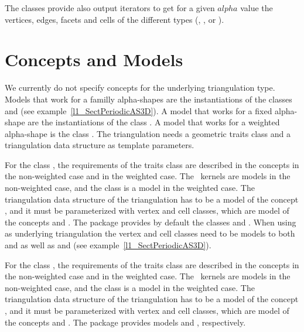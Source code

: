 The classes provide also output iterators  to  get for a given $alpha$ value
the vertices, edges, facets and cells of the different types
(, ,  or 
).



\section{Concepts and Models\label{I1_SectDtClass3D}}


We currently do not specify concepts for the underlying triangulation
type. Models that work for a familly alpha-shapes are the instantiations
of the classes  and
 (see
example~\ref{l1_SectPeriodicAS3D}). A model that works for a fixed alpha-shape are the instantiations
of the class .
A model that works for a weighted alpha-shape is 
the class . The triangulation needs a geometric traits class 
and a triangulation data structure as template parameters.

For the class , the requirements of
the traits class are described in the concepts 
in the non-weighted case and  in the weighted case.
The \cgal\ kernels are models in the non-weighted case, and 
the class  is a model
in the weighted case.
The triangulation data structure of the triangulation
has to be a model of the concept ,
and it must be parameterized with vertex and cell classes, which are model of the concepts
 and .
The package provides by default the classes
 and
. When using
 as underlying
triangulation the vertex and cell classes need to be models to both
 and
 as well as
 and 
(see example~\ref{l1_SectPeriodicAS3D}). 



For the class , the requirements of
the traits class are described in the concepts 
in the non-weighted case and  in the weighted case.
The \cgal\ kernels are models in the non-weighted case, and 
the class  is a model
in the weighted case.
The triangulation data structure of the triangulation
has to be a model of the concept ,
and it must be parameterized with vertex and cell classes, which are model of the concepts
 and .
The package provides models  
and , respectively.



